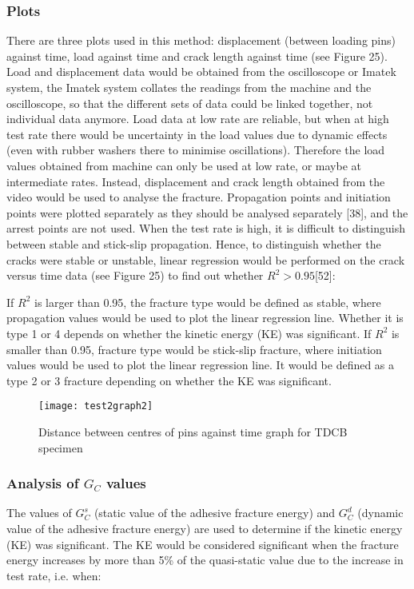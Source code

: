 \documentclass[numbers=noendperiod,chapterprefix=on]{icldt} %
\begin{document}
\subsubsection{Plots}
There are three plots used in this method: displacement (between loading pins) against time, load against time and crack length against time (see Figure 25). 
Load and displacement data would be obtained from the oscilloscope or Imatek system, the Imatek system collates the readings from the machine and the oscilloscope, so that the different sets of data could be linked together, not individual data anymore. Load data at low rate are reliable, but when at high test rate there would be uncertainty in the load values due to dynamic effects (even with rubber washers there to minimise oscillations). Therefore the load values obtained from machine can only be used at low rate, or maybe at intermediate rates. Instead, displacement and crack length obtained from the video would be used to analyse the fracture. 
Propagation points and initiation points were plotted separately as they should be analysed separately [38], and the arrest points are not used. When the test rate is high, it is difficult to distinguish between stable and stick-slip propagation. Hence, to distinguish whether the cracks were stable or unstable, linear regression would be performed on the crack versus time data (see Figure 25) to find out whether $R^2 > 0.95$[52]:

If $R^2$ is larger than 0.95, the fracture type would be defined as stable, where propagation values would be used to plot the linear regression line. Whether it is type 1 or 4 depends on whether the kinetic energy (KE) was significant. 
If $R^2$ is smaller than 0.95, fracture type would be stick-slip fracture, where initiation values would be used to plot the linear regression line. It would be defined as a type 2 or 3 fracture depending on whether the KE was significant.

\begin{figure}[!htpb]
\centering
\texttt{[image: test2graph2]}
\caption{Distance between centres of pins against time graph for TDCB specimen } %
\end{figure}
\FloatBarrier
\subsubsection{Analysis of $G_C$ values}
The values of $G^s_C$ (static value of the adhesive fracture energy) and $G^d_C$ (dynamic value of the adhesive fracture energy) are used to determine if the kinetic energy (KE) was significant. The KE would be considered significant when the fracture energy increases by more than 5\% of the quasi-static value due to the increase in test rate, i.e. when: 
\end{document}
